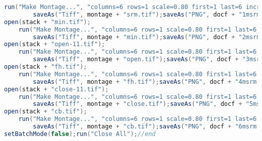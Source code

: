 \begin{lstlisting}[language=java, caption=Segmentation by region merging., label=cd:segment-srm]
	run("Make Montage...", "columns=6 rows=1 scale=0.80 first=1 last=6 increment=1 border=4 font=30 label");
		saveAs("Tiff", montage + "srm.tif");saveAs("PNG", docf + "1msrm.png");
open(stack + "min.tif");
	run("Make Montage...", "columns=6 rows=1 scale=0.80 first=1 last=6 increment=1 border=4 font=30 label");
		saveAs("Tiff", montage + "min.tif");saveAs("PNG", docf + "2msrm.png");
open(stack + "open-11.tif");
	run("Make Montage...", "columns=6 rows=1 scale=0.80 first=1 last=6 increment=1 border=4 font=30 label");
		saveAs("Tiff", montage + "open.tif");saveAs("PNG", docf + "3msrm.png");
open(stack + "fh.tif"); 
	run("Make Montage...", "columns=6 rows=1 scale=0.80 first=1 last=6 increment=1 border=4 font=30 label");
		saveAs("Tiff", montage + "fh.tif");saveAs("PNG", docf + "4msrm.png");
open(stack + "close-11.tif"); 
	run("Make Montage...", "columns=6 rows=1 scale=0.80 first=1 last=6 increment=1 border=4 font=30 label");
		saveAs("Tiff", montage + "close.tif");saveAs("PNG", docf + "5msrm.png");
open(stack + "cb.tif"); 
	run("Make Montage...", "columns=6 rows=1 scale=0.80 first=1 last=6 increment=1 border=4 font=30 label");
		saveAs("Tiff", montage + "cb.tif");saveAs("PNG", docf + "6msrm.png");
setBatchMode(false);run("Close All");//end
\end{lstlisting}


